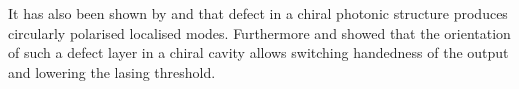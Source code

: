 It has also been shown by \textcite{kopp_twist_2002} and \textcite{oldano_comment_2004} that defect in a chiral photonic structure produces circularly polarised localised modes. Furthermore \textcite{harutyunyan_optical_2007} and \textcite{belyakova_optical_2011} showed that the orientation of such a defect layer in a chiral cavity allows switching handedness of the output and lowering the lasing threshold.
